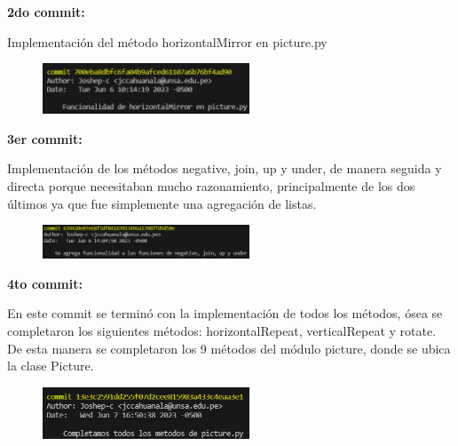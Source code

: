 \documentclass{article}
\begin{document}
	\textbf{2do commit:}
	
	\vspace{0.3cm}
	Implementación del método horizontalMirror en picture.py
	\vspace{0.3cm}
	
	\begin{figure}[H]
		\centering
		\includegraphics[width=0.55\textwidth,keepaspectratio]{img/commit2.png}
	\end{figure}
	
	\textbf{3er commit:}
	
	\vspace{0.3cm}
	Implementación de los métodos negative, join, up y under, de manera seguida y directa porque necesitaban mucho razonamiento, principalmente de los dos últimos ya que fue simplemente una agregación de listas.
	\vspace{0.3cm}
	
	\begin{figure}[H]
		\centering
		\includegraphics[width=0.55\textwidth,keepaspectratio]{img/commit3.png}
	\end{figure}
	
	\textbf{4to commit:}
	
	\vspace{0.3cm}
	En este commit se terminó con la implementación de todos los métodos, ósea se completaron los siguientes métodos: horizontalRepeat, verticalRepeat y rotate. De esta manera se completaron los 9 métodos del módulo picture, donde se ubica la clase Picture.
	\vspace{0.3cm}
	
	\begin{figure}[H]
		\centering
		\includegraphics[width=0.55\textwidth,keepaspectratio]{img/commit4.png}
	\end{figure}
	
\end{document}
